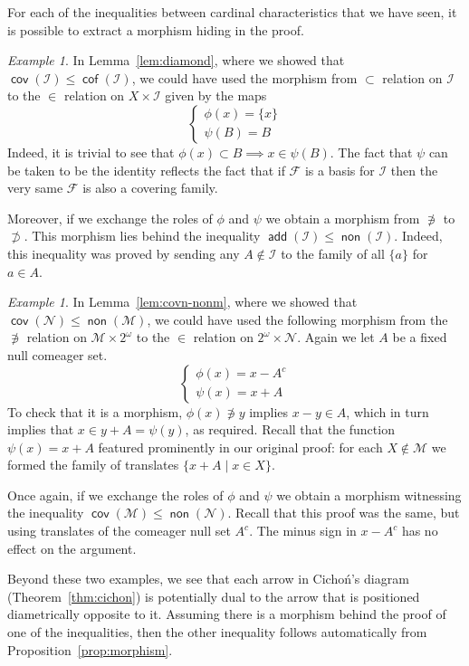\documentclass[11pt,oneside]{amsbook}
\newcommand{\Null}{\mathcal N}
\newcommand{\Meager}{\mathcal M}
\DeclareMathOperator{\add}{\mathsf{add}}
\DeclareMathOperator{\non}{\mathsf{non}}
\DeclareMathOperator{\cov}{\mathsf{cov}}
\DeclareMathOperator{\cof}{\mathsf{cof}}
\theoremstyle{definition}
\theoremstyle{plain}
\theoremstyle{definition}
\theoremstyle{remark}
\newtheorem{example}[thm]{Example}
\numberwithin{equation}{section}
\numberwithin{figure}{section}
\begin{document}
For each of the inequalities between cardinal characteristics that we have seen, it is possible to extract a morphism hiding in the proof. 

\begin{example}
  In Lemma~\ref{lem:diamond}, where we showed that $\cov(\mathcal I)\leq\cof(\mathcal I)$, we could have used the morphism from $\subset$ relation on $\mathcal I$ to the $\in$ relation on $X\times\mathcal I$ given by the maps
  \[\begin{cases}\phi(x)=\{x\}\\\psi(B)=B\end{cases}
  \]
  Indeed, it is trivial to see that $\phi(x)\subset B\implies x\in\psi(B)$. The fact that $\psi$ can be taken to be the identity reflects the fact that if $\mathcal F$ is a basis for $\mathcal I$ then the very same $\mathcal F$ is also a covering family.

  Moreover, if we exchange the roles of $\phi$ and $\psi$ we obtain a morphism from $\not\ni$ to $\not\supset$. This morphism lies behind the inequality $\add(\mathcal I)\leq\non(\mathcal I)$. Indeed, this inequality was proved by sending any $A\notin\mathcal I$ to the family of all $\{a\}$ for $a\in A$.
\end{example}

\begin{example}
  In Lemma~\ref{lem:covn-nonm}, where we showed that $\cov(\Null)\leq\non(\Meager)$, we could have used the following morphism from the $\not\ni$ relation on $\Meager\times2^\omega$ to the $\in$ relation on $2^\omega\times\Null$. Again we let $A$ be a fixed null comeager set.
  \[\begin{cases}\phi(x)=x-A^c\\\psi(x)=x+A\end{cases}
  \]
  To check that it is a morphism, $\phi(x)\not\ni y$ implies $x-y\in A$, which in turn implies that $x\in y+A=\psi(y)$, as required. Recall that the function $\psi(x)=x+A$ featured prominently in our original proof: for each $X\notin\Meager$ we formed the family of translates $\{x+A\mid x\in X\}$.
  
  Once again, if we exchange the roles of $\phi$ and $\psi$ we obtain a morphism witnessing the inequality $\cov(\Meager)\leq\non(\Null)$. Recall that this proof was the same, but using translates of the comeager null set $A^c$. The minus sign in $x-A^c$ has no effect on the argument.
\end{example}

Beyond these two examples, we see that each arrow in Cicho\'n's diagram (Theorem~\ref{thm:cichon}) is potentially dual to the arrow that is positioned diametrically opposite to it. Assuming there is a morphism behind the proof of one of the inequalities, then the other inequality follows automatically from Proposition~\ref{prop:morphism}.
\end{document}
